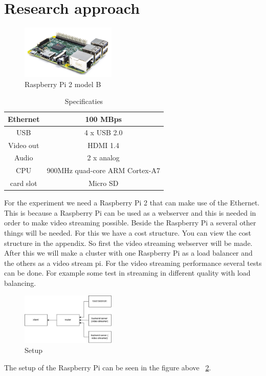\documentclass{sig-alternate-br}
\begin{document}
\section{Research approach}
\begin{figure}[H]
	\centering 
	\includegraphics[width=0.4\textwidth]{Pi2ModB1GB_-comp.jpeg}
	\caption{Raspberry Pi 2 model B}
	\label{fig:raspberry} %
\end{figure}
\begin{table}[H]
	\centering \caption{Specificaties}
	\begin{tabular}{|c|c|} \hline
		Ethernet & 100 MBps \\ \hline
		USB & 4 x USB 2.0 \\ \hline
		Video out & HDMI 1.4 \\ \hline
		Audio & 2 x analog \\ \hline
		CPU & 900MHz quad-core ARM Cortex-A7 \\ \hline
		card slot & Micro SD  \\ \hline
	\end{tabular}
	\label{tab:Specificaties}
\end{table}
For the experiment we need a Raspberry Pi 2 that can make use of the Ethernet. This is because a Raspberry Pi can be used as a webserver and this is needed in order to make video streaming possible. Beside the Raspberry Pi a several other things will be needed. For this we have a cost structure. You can view the cost structure in the appendix. \newline
So first the video streaming webserver will be made. 
After this we will make a cluster with one Raspberry Pi as a load balancer and the others as a video stream pi.  For the video streaming performance several tests can be done. For example some test in streaming in different quality with load balancing. 

\begin{figure}[H]
\centering 
\includegraphics[width=0.4\textwidth]{raspberry pi setup.jpg}
\caption{Setup}
\label{fig:setup} %
\end{figure}
The setup of the Raspberry Pi can be seen in the figure above ~\ref{fig:setup}.
\end{document}
